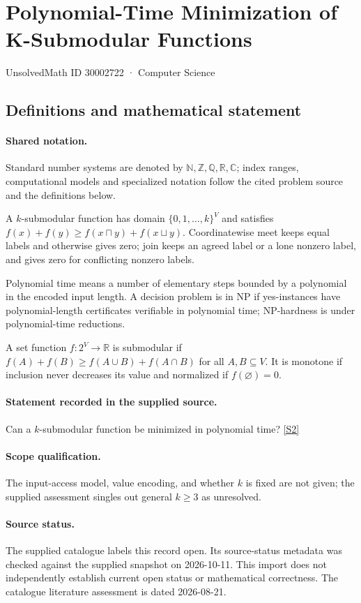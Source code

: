 \documentclass[11pt]{article}
\newcommand{\sref}[2]{\hyperlink{source:#1:#2}{[S#2]}}
\begin{document}
\setcounter{section}{30002721}
\section{Polynomial-Time Minimization of K-Submodular Functions}\label{30002722}
{\small\sffamily UnsolvedMath ID 30002722 · Computer Science}
\subsection{Definitions and mathematical statement}

\paragraph{Shared notation.}Standard number systems are denoted by $\mathbb N,\mathbb Z,\mathbb Q,\mathbb R,\mathbb C$; index ranges, computational models and specialized notation follow the cited problem source and the definitions below.


A $k$-submodular function has domain $\{0,1,\ldots,k\}^V$ and satisfies $f(x)+f(y)\geq f(x\sqcap y)+f(x\sqcup y)$. Coordinatewise meet keeps equal labels and otherwise gives zero; join keeps an agreed label or a lone nonzero label, and gives zero for conflicting nonzero labels.

Polynomial time means a number of elementary steps bounded by a polynomial in the encoded input length. A decision problem is in $\mathrm{NP}$ if yes-instances have polynomial-length certificates verifiable in polynomial time; NP-hardness is under polynomial-time reductions.

A set function $f:2^V\to\mathbb R$ is submodular if $f(A)+f(B)\geq f(A\cup B)+f(A\cap B)$ for all $A,B\subseteq V$. It is monotone if inclusion never decreases its value and normalized if $f(\varnothing)=0$.
\paragraph{Statement recorded in the supplied source.}
Can a $k$-submodular function be minimized in polynomial time? \sref{30002722}{2}
\paragraph{Scope qualification.}
The input-access model, value encoding, and whether $k$ is fixed are not given; the supplied assessment singles out general $k\geq3$ as unresolved.
\paragraph{Source status.}
The supplied catalogue labels this record open. Its source-status metadata was checked against the supplied snapshot on 2026-10-11. This import does not independently establish current open status or mathematical correctness. The catalogue literature assessment is dated 2026-08-21.
\end{document}
